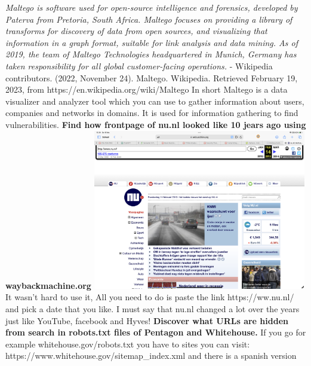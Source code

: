 \documentclass[12pt, letterpaper]{article}
\begin{document}
\emph{Maltego is software used for open-source intelligence and forensics, developed by Paterva from Pretoria, South Africa. Maltego focuses on providing a library of transforms for discovery of data from open sources, and visualizing that information in a graph format, suitable for link analysis and data mining. As of 2019, the team of Maltego Technologies headquartered in Munich, Germany has taken responsibility for all global customer-facing operations.} - Wikipedia contributors. (2022, November 24). Maltego. Wikipedia. Retrieved February 19, 2023, from https://en.wikipedia.org/wiki/Maltego
\hfill\break
\hfill\break
In short Maltego is a data visualizer and analyzer tool which you can use to gather information about users, companies and networks in domains. It is used for information gathering to find vulnerabilities.
\hfill\break
\hfill\break
\textbf{Find how frontpage of nu.nl looked like 10 jears ago using waybackmachine.org}
\hfill\break
\hfill\break
\includegraphics[width=0.7\textwidth]{PDFs/Week 2/Wayback nu.png}
\hfill\break
\hfill\break
It wasn't hard to use it, All you need to do is paste the link https://ww.nu.nl/ and pick a date that you like. I must say that nu.nl changed a lot over the years just like YouTube, facebook and Hyves!
\hfill\break
\hfill\break
\textbf{Discover what URLs are hidden from search in robots.txt files of Pentagon and Whitehouse.}
\hfill\break
\hfill\break
If you go for example whitehouse.gov/robots.txt you have to sites you can visit: https://www.whitehouse.gov/sitemap\_index.xml and there is a spanish version
\end{document}
